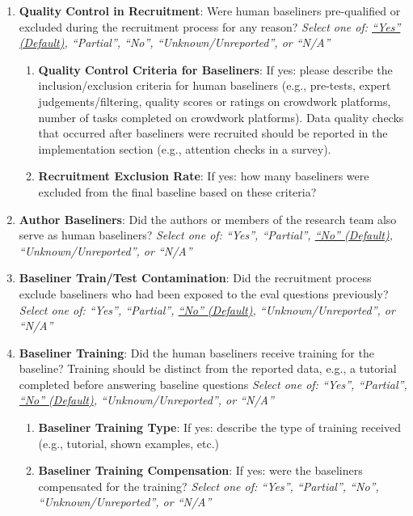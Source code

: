 \documentclass{article}
\begin{document}
\begin{enumerate}[leftmargin=30pt, topsep=0pt, itemsep=0pt]
    \item \textbf{Quality Control in Recruitment}: Were human baseliners pre-qualified or excluded during the recruitment process for any reason?
    \newline \textit{Select one of: \ul{``Yes'' (Default)}, ``Partial'', ``No'', ``Unknown/Unreported'', or ``N/A''}
    \begin{enumerate}
        \item \textbf{Quality Control Criteria for Baseliners}: If yes: please describe the inclusion/exclusion criteria for human baseliners (e.g., pre-tests, expert judgements/filtering, quality scores or ratings on crowdwork platforms, number of tasks completed on crowdwork platforms). Data quality checks that occurred after baseliners were recruited should be reported in the implementation section (e.g., attention checks in a survey).
        
        \item \textbf{Recruitment Exclusion Rate}: If yes: how many baseliners were excluded from the final baseline based on these criteria?
    \end{enumerate}
        
    \item \textbf{Author Baseliners}: Did the authors or members of the research team also serve as human baseliners?
    \newline \textit{Select one of: ``Yes'', ``Partial'', \ul{``No'' (Default)}, ``Unknown/Unreported'', or ``N/A''}
    
    \item \textbf{Baseliner Train/Test Contamination}: Did the recruitment process exclude baseliners who had been exposed to the eval questions previously?
    \newline \textit{Select one of: ``Yes'', ``Partial'', \ul{``No'' (Default)}, ``Unknown/Unreported'', or ``N/A''}
    
    \item \textbf{Baseliner Training}: Did the human baseliners receive training for the baseline? Training should be distinct from the reported data, e.g., a tutorial completed before answering baseline questions
    \newline \textit{Select one of: ``Yes'', ``Partial'', \ul{``No'' (Default)}, ``Unknown/Unreported'', or ``N/A''}
    \begin{enumerate}
        \item \textbf{Baseliner Training Type}: If yes: describe the type of training received (e.g., tutorial, shown examples, etc.)
        \item \textbf{Baseliner Training Compensation}: If yes: were the baseliners compensated for the training?
        \newline \textit{Select one of: ``Yes'', ``Partial'', ``No'', ``Unknown/Unreported'', or ``N/A''}
        

\end{enumerate}
\end{enumerate}
\end{document}

